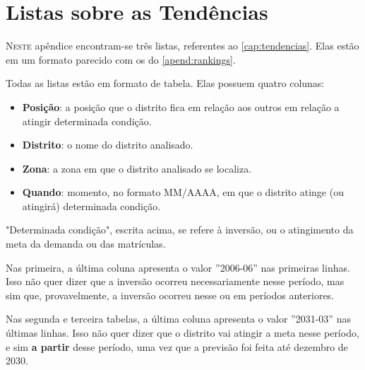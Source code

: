 \chapter{Listas sobre as Tendências}
\label{apend:tendencias}

\lettrine{N}{este} apêndice encontram-se três listas, referentes ao \autoref{cap:tendencias}. Elas estão em um formato parecido com os do \autoref{apend:rankings}.

Todas as listas estão em formato de tabela. Elas possuem quatro colunas:
 
\begin{itemize}
	\item \textbf{Posição}: a posição que o distrito fica em relação aos outros em relação a atingir determinada condição.
	\item \textbf{Distrito}: o nome do distrito analisado.
	\item \textbf{Zona}: a zona em que o distrito analisado se localiza.
	\item \textbf{Quando}: momento, no formato MM/AAAA, em que o distrito atinge (ou atingirá) determinada condição.
\end{itemize}

"Determinada condição", escrita acima, se refere à inversão, ou o atingimento da meta da demanda ou das matrículas.

Nas primeira, a última coluna apresenta o valor ''2006-06'' nas primeiras linhas. Isso não quer dizer que a inversão ocorreu necessariamente nesse período, mas sim que, provavelmente, a inversão ocorreu nesse ou em períodos anteriores.

Nas segunda e terceira tabelas, a última coluna apresenta o valor ''2031-03'' nas últimas linhas. Isso não quer dizer que o distrito vai atingir a meta nesse período, e sim \textbf{a partir} desse período, uma vez que a previsão foi feita até dezembro de 2030.